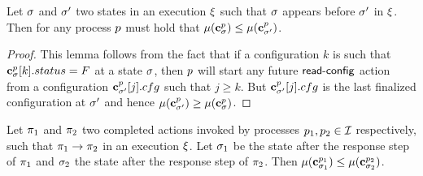 \begin{lemma}
	\label{lem:final:monotonic}
	Let $\sigma$ and $\sigma'$ two states in an execution $\EX$ such that $\sigma$ appears before $\sigma'$ in $\EX$.
 	Then for any process $p$ must hold that $\mu(\mathbf{c}^{p}_{\sigma})\leq \mu(\mathbf{c}^{p}_{\sigma'})$.  %
\end{lemma}

\begin{proof}
	This lemma follows from the fact that if a configuration $k$ is such that 
	$\mathbf{c}^{p}_{\sigma}[k].status=F$ at a state $\sigma$, then $p$ will start any 
	future $\act{read-config}$ action from a configuration $\mathbf{c}^{p}_{\sigma'}[j].cfg$
	such that $j\geq k$. But $\mathbf{c}^{p}_{\sigma'}[j].cfg$ is the last finalized configuration 
	at $\sigma'$ and hence $\mu(\mathbf{c}^{p}_{\sigma'})\geq \mu(\mathbf{c}^{p}_{\sigma})$.
\end{proof}

\begin{lemma}  
	\label{lem:finalconf}
	Let $\pi_1$ and $\pi_2$ two 
	completed  actions invoked by processes $p_1, p_2\in\mathcal{I}$ 
	respectively, such that $\pi_1\rightarrow\pi_2$ in an execution $\EX$. 
	Let $\sigma_1$ be the state after the response 
	step of $\pi_1$ and $\sigma_2$ the state after the response step 
	of $\pi_2$. Then 
	$\mu(\mathbf{c}^{p_1}_{\sigma_1})\leq\mu(\mathbf{c}^{p_2}_{\sigma_2})$.
\end{lemma}


